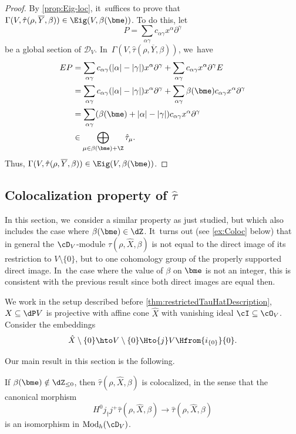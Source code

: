 \begin{proof}
By \cref{prop:Eig-loc}, it~suffices to prove that $\Gamma(V, \hat\tau(\rho, \overline Y, \beta))\in \Eig(V,\beta(\bme))$. To do this, let
\[
P= \sum_{\alpha\gamma} c_{\alpha\gamma} x^\alpha\partial^\gamma
\]
be a global section of $\mathscr{D}_V$. In~$\Gamma(V, \hat\tau(\rho, \overline Y, \beta))$, we~have
\begin{align*}
EP &= \sum_{\alpha\gamma} c_{\alpha\gamma} (|\alpha| - |\gamma|)x^\alpha\partial^\gamma + \sum_{\alpha\gamma} c_{\alpha\gamma} x^\alpha\partial^\gamma E\\
&= \sum_{\alpha\gamma} c_{\alpha\gamma} (|\alpha| - |\gamma|)x^\alpha\partial^\gamma + \sum_{\alpha\gamma} \beta(\bme)c_{\alpha\gamma} x^\alpha\partial^\gamma\\
&= \sum_{\alpha\gamma} (\beta(\bme) + |\alpha| - |\gamma|)c_{\alpha\gamma}x^\alpha\partial^\gamma\\
&\in \bigoplus_{\mu \in \beta(\bme) + \Z} \hat\tau_\mu.
\end{align*}
Thus, $\Gamma(V, \hat\tau(\rho, \overline Y, \beta))\in \Eig(V,\beta(\bme))$.
\end{proof}

\subsection{Colocalization property of \texorpdfstring{$\widehat{\tau}$}{\textbackslash hat\textbackslash tau}}
\label{subsec:CoLocProp}

In this section, we~consider a similar property as just studied, but which also includes the case where $\beta(\bme)\in \dZ$. It~turns out (see \cref{ex:Coloc} below) that in general the $\cD_V$\nobreakdash-mod\-ule $\hat{\tau}(\rho, \hat{X}, \beta)$ is not equal to the direct image of its restriction to $V\setminus \{0\}$, but to one cohomology group of the properly supported direct image. In~the case where the value of $\beta$ on $\bme$ is not an integer, this is consistent with the previous result since both direct images are equal then.

We work in the setup described before \cref{thm:restrictedTauHatDescription}, \ie $X\subseteq \dP V$ is projective with affine cone $\hat{X}$ with vanishing ideal $\cI\subseteq \cO_V$. Consider the embeddings
\[
\hat{X} \setminus \{0\} \hto V\setminus\{0\} \Hto{j} V\Hfrom{i_{\{0\}}} \{0\}.
\]

Our main result in this section is the following.

\begin{thm}\label{theo:coloc}
If $\beta(\bme)\notin \dZ_{\leq 0}$, then
$\hat{\tau}(\rho, \hat{X}, \beta)$ is colocalized, in the sense that the canonical morphism
\[
H^0j_\dag j^+ \hat{\tau}(\rho, \hat{X}, \beta) \to \hat{\tau}(\rho, \hat{X}, \beta)
\]
is an isomorphism in $\textup{Mod}_h(\cD_V)$.
\end{thm}

